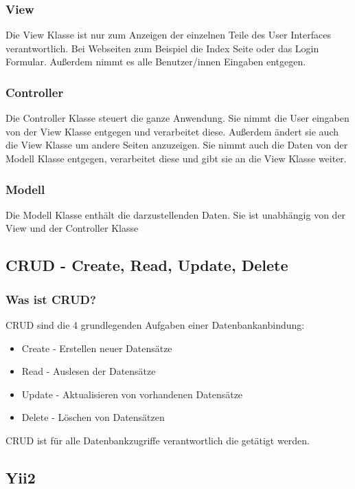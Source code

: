 \subsubsection{View}
Die View Klasse ist nur zum Anzeigen der einzelnen Teile des User Interfaces verantwortlich. Bei Webseiten zum Beispiel die Index Seite oder das Login Formular. Außerdem nimmt es alle Benutzer/innen Eingaben entgegen.
\subsubsection{Controller}
Die Controller Klasse steuert die ganze Anwendung. Sie nimmt die User eingaben von der View Klasse entgegen und verarbeitet diese. Außerdem ändert sie auch die View Klasse um andere Seiten anzuzeigen. Sie nimmt auch die Daten von der Modell Klasse entgegen, verarbeitet diese und gibt sie an die View Klasse weiter.
\subsubsection{Modell}
Die Modell Klasse enthält die darzustellenden Daten. Sie ist unabhängig von der View und der Controller Klasse

\subsection{CRUD - Create, Read, Update, Delete} \label{sec:CRUD}

\subsubsection{Was ist CRUD?}
CRUD sind die 4 grundlegenden Aufgaben einer Datenbankanbindung:
\begin{itemize}
	\item Create - Erstellen neuer Datensätze
	\item Read - Auslesen der Datensätze
	\item Update - Aktualisieren von vorhandenen Datensätze
	\item Delete - Löschen von Datensätzen
\end{itemize}
\cite{CRUD}
\newline
CRUD ist für alle Datenbankzugriffe verantwortlich die getätigt werden.


\subsection{Yii2} \label{sec:YII2}

